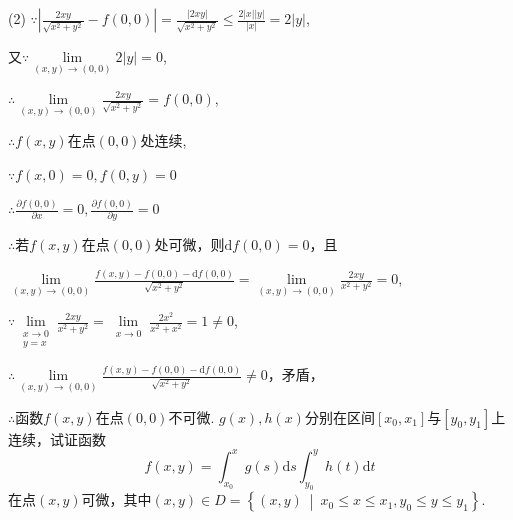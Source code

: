 \documentclass[12pt,UTF8]{ctexart}
\newcommand\Set[2]{\left\{#1\ \middle\vert\ #2 \right\}}
\newcommand\LIM[2]{\lim\limits_{#1\rightarrow#2}}
\begin{document}
\begin{enumerate}
(2)
%
%
%
%
$\because|\frac{2xy}{\sqrt{x^2+y^2}}-f(0,0)|=\frac{|2xy|}{\sqrt{x^2+y^2}}\leq\frac{2|x||y|}{|x|}=2|y|$,

又$\because\LIM{(x,y)}{(0,0)}2|y|=0$,

$\therefore\LIM{(x,y)}{(0,0)}\frac{2xy}{\sqrt{x^2+y^2}}=f(0,0)$,

$\therefore f(x,y)$在点$(0,0)$处连续,

$\because f(x,0)=0,f(0,y)=0$

$\therefore\frac{\partial f(0,0)}{\partial x}=0,\frac{\partial f(0,0)}{\partial y}=0$

$\therefore$若$f(x,y)$在点$(0,0)$处可微，则$\mathrm df(0,0)=0$，且

$\LIM{(x,y)}{(0,0)}\frac{f(x,y)-f(0,0)-\mathrm df(0,0)}{\sqrt{x^2+y^2}}=\LIM{(x,y)}{(0,0)}\frac{2xy}{x^2+y^2}=0$,

$\because\lim\limits_{\substack{x\rightarrow0\\ y=x}}\frac{2xy}{x^2+y^2}=\lim\limits_{\substack{x\rightarrow0}}\frac{2x^2}{x^2+x^2}=1\neq0$,

$\therefore\LIM{(x,y)}{(0,0)}\frac{f(x,y)-f(0,0)-\mathrm df(0,0)}{\sqrt{x^2+y^2}}\neq0$，矛盾，

$\therefore$函数$f(x,y)$在点$(0,0)$不可微.
$g(x),h(x)$分别在区间$[x_0,x_1]$与$[y_0,y_1]$上连续，试证函数
\[f(x,y)=\int_{x_0}^xg(s)\mathrm ds\int_{y_0}^yh(t)\mathrm dt\]
在点$(x,y)$可微，其中$(x,y)\in D=\Set{(x,y)}{x_0\leq x\leq x_1,y_0\leq y\leq y_1}$.


\end{enumerate}
\end{document}

